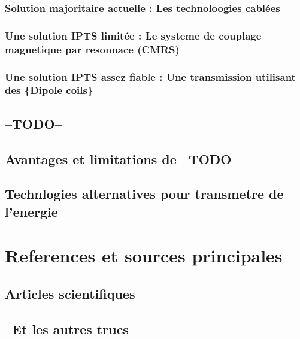 \documentclass[12pt]{report}
\begin{document}
\subsection{Solution majoritaire actuelle : Les technoloogies cablées}
\subsection{Une solution IPTS limitée : Le systeme de couplage magnetique par resonnace (CMRS)}
\subsection{Une solution IPTS assez fiable : Une transmission utilisant des \{Dipole coils\}}
\section{--TODO--} %
\section{Avantages et limitations de --TODO--}
\section{Technlogies alternatives pour transmetre de l'energie}
\chapter{References et sources principales}
\section{Articles scientifiques}
\section{--Et les autres trucs--}
\end{document}
